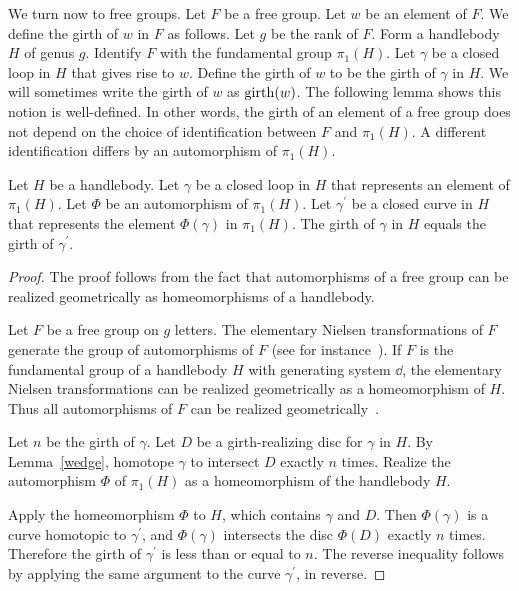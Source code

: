 We turn now to free groups.  Let $F$ be a free group.  Let $w$ be an element of $F$.  We define the girth of $w$ in $F$ as follows.  Let $g$ be the rank of $F$.  Form a handlebody $H$ of genus $g$.  Identify $F$ with the fundamental group $\pi_{1}(H)$.  Let $\gamma$ be a closed loop in $H$ that gives rise to $w$.  Define the girth of $w$ to be the girth of $\gamma$ in $H$.  We will sometimes write the girth of $w$ as $\operatorname{girth}(w)$.  The following lemma shows this notion is well-defined.  In other words, the girth of an element of a free group does not depend on the choice of identification between $F$ and $\pi_{1}(H)$.  A different identification differs by an automorphism of $\pi_{1}(H)$.

\begin{lemma}
Let $H$ be a handlebody.  Let $\gamma$ be a closed loop in $H$ that represents an element of $\pi_{1}(H)$.  Let $\Phi$ be an automorphism of $\pi_{1}(H)$.  Let $\gamma^{\prime}$ be a closed curve in $H$ that represents the element $\Phi(\gamma)$ in $\pi_{1}(H)$.  The girth of $\gamma$ in $H$ equals the girth of $\gamma^{\prime}$. 
\end{lemma}

\begin{proof}
The proof follows from the fact that automorphisms of a free group can be realized geometrically as homeomorphisms of a handlebody.

Let $F$ be a free group on $g$ letters.  The elementary Nielsen transformations of $F$ generate the group of automorphisms of $F$ (see for instance~\cite[Ch. I.4]{LSch}).  If $F$ is the fundamental group of a handlebody $H$ with generating system $\dd$, the elementary Nielsen transformations can be realized geometrically as a homeomorphism of $H$.  Thus all automorphisms of $F$ can be realized geometrically~\cite{Z}.

Let $n$ be the girth of $\gamma$.  Let $D$ be a girth-realizing disc for $\gamma$ in $H$.  By Lemma~\ref{wedge}, homotope $\gamma$ to intersect $D$ exactly $n$ times.  Realize the automorphism $\Phi$ of $\pi_{1}(H)$ as a homeomorphism of the handlebody $H$.

Apply the homeomorphism $\Phi$ to $H$, which contains $\gamma$ and $D$.  Then $\Phi(\gamma)$ is a curve homotopic to $\gamma^{\prime}$, and $\Phi(\gamma)$ intersects the disc $\Phi(D)$ exactly $n$ times.  Therefore the girth of $\gamma^{\prime}$ is less than or equal to $n$.  The reverse inequality follows by applying the same argument to the curve $\gamma^{\prime}$, in reverse.
\end{proof}

